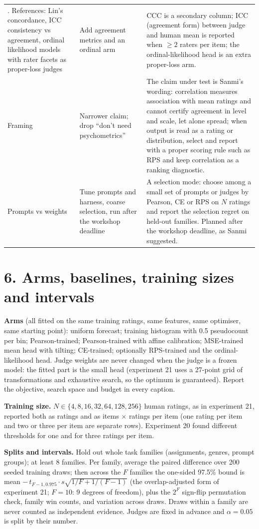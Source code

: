 \documentclass[10.5pt]{article}
\newcommand{\ra}{\raggedright\arraybackslash}
\begin{document}
{\begin{longtable}{@{}>{\ra}p{3.3cm}>{\ra}p{5.0cm}>{\ra}p{7.2cm}@{}}
5. References: Lin's concordance, ICC consistency vs agreement, ordinal likelihood models with rater facets as proper-loss judges & Add agreement metrics and an ordinal arm & CCC is a secondary column; ICC (agreement form) between judge and human mean is reported when $\ge2$ raters per item; the ordinal-likelihood head is an extra proper-loss arm.\\
Framing & Narrower claim; drop ``don't need psychometrics'' & The claim under test is Sanmi's wording: correlation measures association with mean ratings and cannot certify agreement in level and scale, let alone spread; when output is read as a rating or distribution, select and report with a proper scoring rule such as RPS and keep correlation as a ranking diagnostic.\\
Prompts vs weights & Tune prompts and harness, coarse selection, run after the workshop deadline & A selection mode: choose among a small set of prompts or judges by Pearson, CE or RPS on $N$ ratings and report the selection regret on held-out families. Planned after the workshop deadline, as Sanmi suggested.\\
\bottomrule
\end{longtable}}

\section*{6. Arms, baselines, training sizes and intervals}
\textbf{Arms} (all fitted on the same training ratings, same features, same optimiser, same starting point): uniform forecast; training histogram with 0.5 pseudocount per bin; Pearson-trained; Pearson-trained with affine calibration; MSE-trained mean head with tilting; CE-trained; optionally RPS-trained and the ordinal-likelihood head. Judge weights are never changed when the judge is a frozen model: the fitted part is the small head (experiment 21 uses a 27-point grid of transformations and exhaustive search, so the optimum is guaranteed). Report the objective, search space and budget in every caption.

\textbf{Training size.} $N\in\{4,8,16,32,64,128,256\}$ human ratings, as in experiment 21, reported both as ratings and as items $\times$ ratings per item (one rating per item and two or three per item are separate rows). Experiment 20 found different thresholds for one and for three ratings per item.

\textbf{Splits and intervals.} Hold out whole task families (assignments, genres, prompt groups); at least 8 families. Per family, average the paired difference over 200 seeded training draws; then across the $F$ families the one-sided 97.5\% bound is mean $-\,t_{F-1,0.975}\cdot s\sqrt{1/F+1/(F-1)}$ (the overlap-adjusted form of experiment 21; $F=10$: 9 degrees of freedom), plus the $2^F$ sign-flip permutation check, family win counts, and variation across draws. Draws within a family are never counted as independent evidence. Judges are fixed in advance and $\alpha=0.05$ is split by their number.
\end{document}
